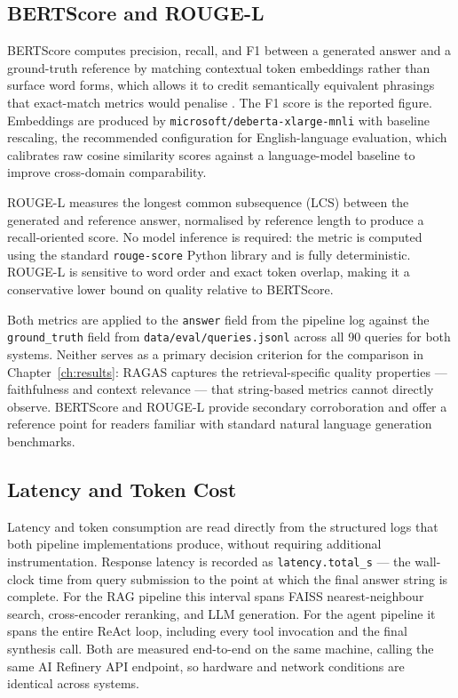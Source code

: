 \subsection{BERTScore and ROUGE-L}

BERTScore computes precision, recall, and F1 between a generated answer and a ground-truth reference by matching contextual token embeddings rather than surface word forms, which allows it to credit semantically equivalent phrasings that exact-match metrics would penalise \cite{zhang2020bertscore}. The F1 score is the reported figure. Embeddings are produced by \texttt{microsoft/deberta-xlarge-mnli} with baseline rescaling, the recommended configuration for English-language evaluation, which calibrates raw cosine similarity scores against a language-model baseline to improve cross-domain comparability.

ROUGE-L measures the longest common subsequence (LCS) between the generated and reference answer, normalised by reference length to produce a recall-oriented score. No model inference is required: the metric is computed using the standard \texttt{rouge-score} Python library and is fully deterministic. ROUGE-L is sensitive to word order and exact token overlap, making it a conservative lower bound on quality relative to BERTScore.

Both metrics are applied to the \texttt{answer} field from the pipeline log against the \texttt{ground\_truth} field from \texttt{data/eval/queries.jsonl} across all 90 queries for both systems. Neither serves as a primary decision criterion for the comparison in Chapter~\ref{ch:results}: RAGAS captures the retrieval-specific quality properties — faithfulness and context relevance — that string-based metrics cannot directly observe. BERTScore and ROUGE-L provide secondary corroboration and offer a reference point for readers familiar with standard natural language generation benchmarks.

\subsection{Latency and Token Cost}

Latency and token consumption are read directly from the structured logs that both pipeline implementations produce, without requiring additional instrumentation. Response latency is recorded as \texttt{latency.total\_s} — the wall-clock time from query submission to the point at which the final answer string is complete. For the RAG pipeline this interval spans FAISS nearest-neighbour search, cross-encoder reranking, and LLM generation. For the agent pipeline it spans the entire ReAct loop, including every tool invocation and the final synthesis call. Both are measured end-to-end on the same machine, calling the same AI Refinery API endpoint, so hardware and network conditions are identical across systems.

